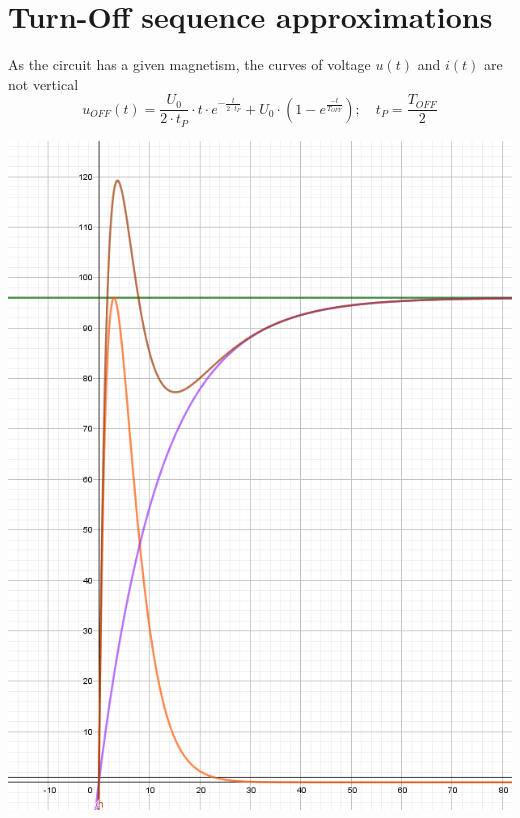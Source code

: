 \documentclass{article}
\begin{document}
    \newpage
    
\section{Turn-Off sequence approximations}
    As the circuit has a given magnetism, the curves of voltage $u(t)$ and $i(t)$ are not vertical
    \begin{equation}
        u_{OFF}(t) = \frac{U_0}{2 \cdot t_P} \cdot t \cdot e^{-\frac{t}{2 \cdot t_P}} + U_0\cdot (1 - e^{\frac{-t}{T_{OFF}}});\quad t_P = \frac{T_{OFF}}{2}
    \end{equation}
    \begin{center}
        \includegraphics[scale=0.35]{images/VoltageApprox.PNG}
    \end{center}
    
\end{document}
